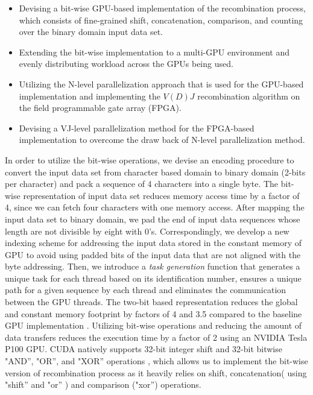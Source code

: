 \begin{itemize}
  \item Devising a bit-wise GPU-based implementation of the recombination process, which consists of fine-grained shift, concatenation, comparison, and counting over the binary domain input data set.%
  \item Extending the bit-wise implementation to a multi-GPU environment and evenly distributing workload across the GPUs being used.  %
  \item Utilizing the N-level parallelization approach that is used for the GPU-based implementation and implementing the $V(D)J$ recombination algorithm on the field programmable gate array (FPGA).
  \item Devising a VJ-level parallelization method for the FPGA-based implementation to overcome the draw back of N-level parallelization method.   
\end{itemize}



In order to utilize the bit-wise operations, we devise an encoding procedure to convert the input data set from character based domain to binary domain (2-bits per character) and pack a sequence of 4 characters into a single byte. The bit-wise representation of input data set reduces memory access time by a factor of 4, since we can fetch four characters with one memory access. After mapping the input data set to binary domain, we pad the end of input data sequences whose length are not divisible by eight with $0$'s. Correspondingly, we develop a new indexing scheme for addressing the input data stored in the constant memory of GPU to avoid using padded bits of the input data that are not aligned with the byte addressing. Then, we introduce a \emph{task generation} function that generates a unique task for each thread based on its identification number, ensures a unique path for a given sequence by each thread and eliminates the communication between the GPU threads. The two-bit based representation reduces the global and constant memory footprint by factors of 4 and 3.5 compared to the baseline GPU implementation \cite{b2}. Utilizing bit-wise operations and reducing the amount of data transfers reduces the execution time by a factor of 2 using an NVIDIA Tesla P100 GPU. CUDA natively supports 32-bit integer shift and 32-bit bitwise "AND'', "OR'', and "XOR'' operations \cite{b13}, which allows us to implement the bit-wise version of recombination process as it heavily relies on shift, concatenation( using "shift'' and "or'' ) and comparison ("xor'') operations.

